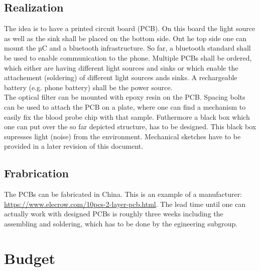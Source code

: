 \documentclass{report}
\newcommand{\newpar}{\vspace{1em}\\}
\begin{document}
\section{Realization}
The idea is to have a printed circuit board (PCB). On this board the light source as well as the sink shall be placed on the bottom side. Ont he top side one can mount the µC and a bluetooth infrastructure. So far, a bluetooth standard shall be used to enable communication to the phone. Multiple PCBs shall be ordered, which either are having different light sources and sinks or which enable the attachement (soldering) of different light sources ands sinks. A rechargeable battery (e.g. phone battery) shall be the power source. 
\newpar
The optical filter can be mounted with epoxy resin on the PCB. Spacing bolts can be used to attach the PCB on a plate, where one can find a mechanism to easily fix the blood probe chip with that sample. Futhermore a black box which one can put over the so far depicted structure, has to be designed. This black box supresses light (noise) from the environment. Mechanical sketches have to be provided in a later revision of this document.     

\section{Frabrication}
The PCBs can be fabricated in China. This is an example of a manufacturer: \url{https://www.elecrow.com/10pcs-2-layer-pcb.html}. The lead time until one can actually work with designed PCBs is roughly three weeks including the assembling and soldering, which has to be done by the egineering subgroup.  

\chapter{Budget}
\end{document}
